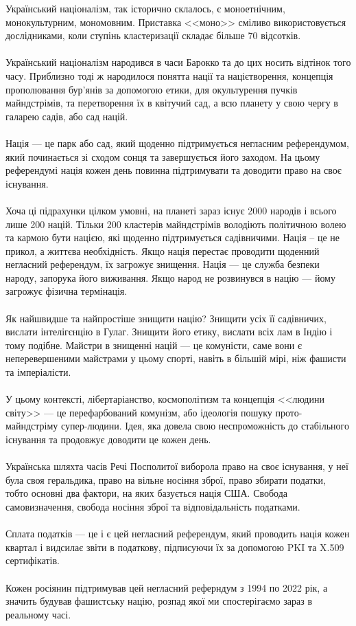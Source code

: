 Український націоналізм, так історично склалось, є моноетнічним, монокультурним, мономовним.
Приставка <<моно>> сміливо використовується дослідниками, коли ступінь кластеризації складає більше 70 відсотків.
\\
\\
Український націоналізм народився в часи Барокко та до цих носить відтінок того часу.
Приблизно тоді ж народилося понятта нації та націєтворення, концепція прополювання бур'янів за допомогою етики,
для окультурення пучків майндстрімів, та перетворення їх в квітучий сад, а всю планету у свою чергу в галарею садів, або сад націй.
\\
\\
Нація --- це парк або сад, який щоденно підтримується негласним референдумом,
який починається зі сходом сонця та завершується його заходом. На цьому референдумі
нація кожен день повинна підтримувати та доводити право на своє існування.
\\
\\
Хоча ці підрахунки цілком умовні, на планеті зараз існує 2000 народів і всього лише 200 націй.
Тільки 200 кластерів майндстрімів володіють політичною волею та кармою бути нацією, які щоденно підтримується садівничими.
Нація -- це не прикол, а життєва необхідність. Якщо нація перестає проводити щоденний
негласний референдум, їх загрожує знищення. Нація --- це служба безпеки народу, запорука його виживання.
Якщо народ не розвинувся в націю --- йому загрожує фізична термінація.
\\
\\
Як найшвидше та найпростіше знищити націю? Знищити усіх її садівничих, вислати інтелігєнцію в Гулаг.
Знищити його етику, вислати всіх лам в Індію і тому подібне. Майстри в знищенні націй --- це комуністи,
саме вони є неперевершеними майстрами у цьому спорті, навіть в більшій мірі, ніж фашисти та імперіалісти.
\\
\\
У цьому контексті, лібертаріанство, космополітизм та концепція <<людини світу>> --- це перефарбований комунізм,
або ідеологія пошуку прото-майндстріму супер-людини. Ідея, яка довела свою неспроможність до стабільного існування
та продовжує доводити це кожен день.
\\
\\
Українська шляхта часів Речі Посполитої виборола право на своє існування, у неї була своя геральдика,
право на вільне носіння зброї, право збирати податки, тобто основні два фактори, на яких базується нація США.
Свобода самовизначення, свобода носіння зброї та відповідальність податками.
\\
\\
Сплата податків --- це і є цей негласний референдум, який проводить нація кожен квартал і видсилає
звіти в податкову, підписуючи їх за допомогою PKI та X.509 сертифікатів.
\\
\\
Кожен росіянин підтримував цей негласний реферндум з 1994 по 2022 рік, а значить будував фашистську націю,
розпад якої ми спостерігаємо зараз в реальному часі.

